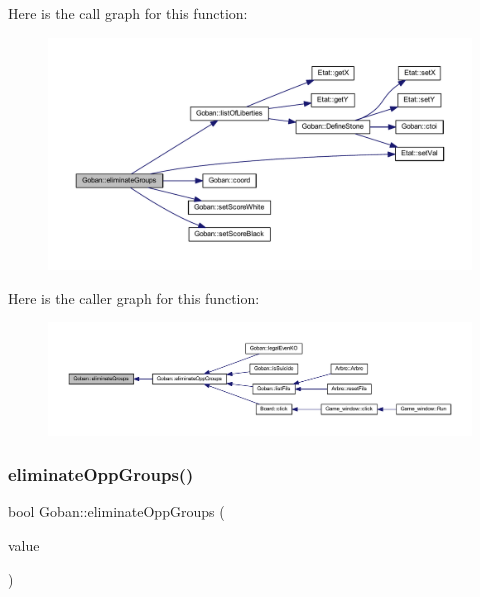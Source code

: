 Here is the call graph for this function\+:
\nopagebreak
\begin{figure}[H]
\begin{center}
\leavevmode
\includegraphics[width=350pt]{class_goban_a1ec70508987f66afff5f8df381731fac_cgraph}
\end{center}
\end{figure}
Here is the caller graph for this function\+:
\nopagebreak
\begin{figure}[H]
\begin{center}
\leavevmode
\includegraphics[width=350pt]{class_goban_a1ec70508987f66afff5f8df381731fac_icgraph}
\end{center}
\end{figure}
\mbox{\label{class_goban_a7858b815885e4af36f05f9d26182cb07}} 
\subsubsection{\texorpdfstring{eliminate\+Opp\+Groups()}{eliminateOppGroups()}}
{\footnotesize\ttfamily bool Goban\+::eliminate\+Opp\+Groups (\begin{DoxyParamCaption}\item[{const \hyperlink{class_etat_af3ddb2296ffc379b7f3ad2bf832f294e}{Etat\+::\+V\+AL} \&}]{value }\end{DoxyParamCaption})}


